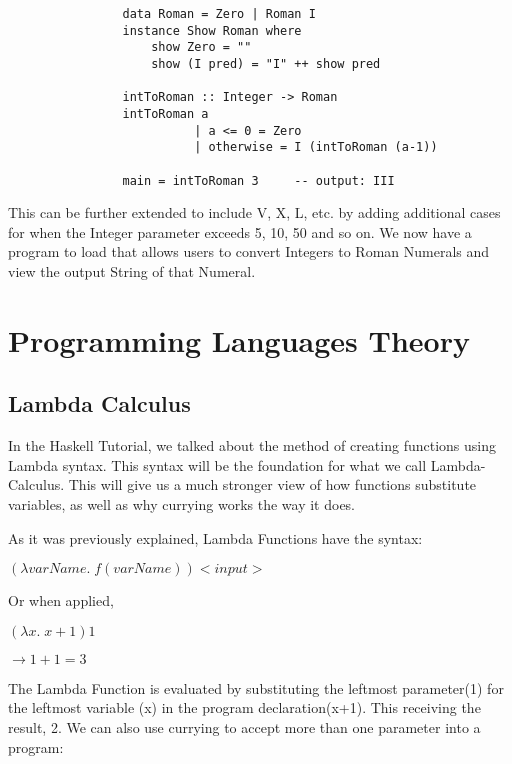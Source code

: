 \documentclass{article}
\begin{document}
            \begin{lstlisting}
                data Roman = Zero | Roman I
                instance Show Roman where
                    show Zero = ""
                    show (I pred) = "I" ++ show pred
                                    
                intToRoman :: Integer -> Roman
                intToRoman a
                          | a <= 0 = Zero
                          | otherwise = I (intToRoman (a-1))
                          
                main = intToRoman 3     -- output: III
            \end{lstlisting}
            
            This can be further extended to include V, X, L, etc. by adding additional cases for when the Integer parameter exceeds 5, 10, 50 and so on. We now have a program to load that allows users to convert Integers to Roman Numerals and view the output String of that Numeral.
        


\section{Programming Languages Theory}

    \subsection{Lambda Calculus}
    In the Haskell Tutorial, we talked about the method of creating functions using Lambda syntax. This syntax will be the foundation for what we call Lambda-Calculus. This will give us a much stronger view of how functions substitute variables, as well as why currying works the way it does.
    
    \medskip\noindent
    As it was previously explained, Lambda Functions have the syntax:
    
    \smallskip
    $(\lambda varName. \; f(varName) ) <input> $
    
    \medskip
    Or when applied,
    
    $(\lambda x. \; x+1) 1$
    
    \smallskip
    $\rightarrow 1 + 1 = 3$
    
    \medskip\noindent
    The Lambda Function is evaluated by substituting the leftmost parameter(1) for the leftmost variable (x) in the program declaration(x+1). This receiving the result, 2. We can also use currying to accept more than one parameter into a program:
    
\end{document}
